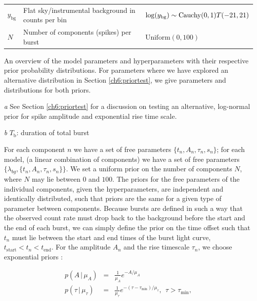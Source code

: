 \documentclass[12pt]{emulateapj}
\newcommand{\given}{\,|\,}
\newcommand{\counts}{y}
\newcommand{\mean}{\lambda}
\begin{document}
\begin{table}[hbtp]
\begin{threeparttable}
\begin{tabularx}{\textwidth}{p{2.0cm}p{10.0cm}X}
$\counts_{\mathrm{bg}}$ & Flat sky/instrumental background in counts per bin & $\log(\counts_{\mathrm{bg}}) \sim \textnormal{Cauchy}(0, 1)T(-21, 21)$ \\
$N$ & Number of components (spikes) per burst & $\mathrm{Uniform}(0,100)$  \\\bottomrule
\end{tabularx}
   \begin{tablenotes}
      \item{An overview of the model parameters and hyperparameters with their respective prior probability distributions. For parameters where we have explored an alternative distribution in Section 
\ref{ch6:priortest}, we give parameters and distributions for both priors.}
     \item[\emph{a}]{See Section \ref{ch6:priortest} for a discussion on testing an alternative, log-normal prior for spike amplitude and exponential rise time scale.}
     \item[\emph{b}]{$T_\mathrm{b}$: duration of total burst}
\end{tablenotes}
\end{threeparttable}
\label{tab:priortable}
\end{table}


For each component $n$ we have a set of free parameters $\{t_n, A_n, \tau_n, s_n \}$; for each model, (a 
linear combination of components) we have a set of free parameters $\{\mean_{bg}, \{t_n, A_n, \tau_n, s_n\} \}$.
We set a uniform prior on the number of components $N$, where $N$ may lie between $0$ and $100$. 
The priors for the free parameters of the individual components, given the hyperparameters, are independent and identically distributed, such that priors 
are the same for a given type of parameter between components. 
Because bursts are defined in such a way that the observed count rate must drop back to the background before the
start and the end of each burst, we can simply define the prior on the time offset such that $t_n$ must lie between
the start and end times of the burst light curve, $t_{\mathrm{start}} < t_n < t_\mathrm{end}$. 
For the amplitude $A_n$ and the rise timescale $\tau_n$, we choose exponential priors \citep{skilling1998}:

\begin{eqnarray}
    p(A \given \mu_A) &=& {\textstyle \frac{1}{\mu_A}}e^{-A/\mu_A} \\
    p(\tau \given \mu_{\tau}) &=& {\textstyle \frac{1}{\mu_\tau}}e^{-(\tau - \tau_{\mathrm{min}})/\mu_{\tau}}, ~~\tau>\tau_{\mathrm{min}},
\label{eqn:exponential_prior}
\end{eqnarray}
\end{document}
